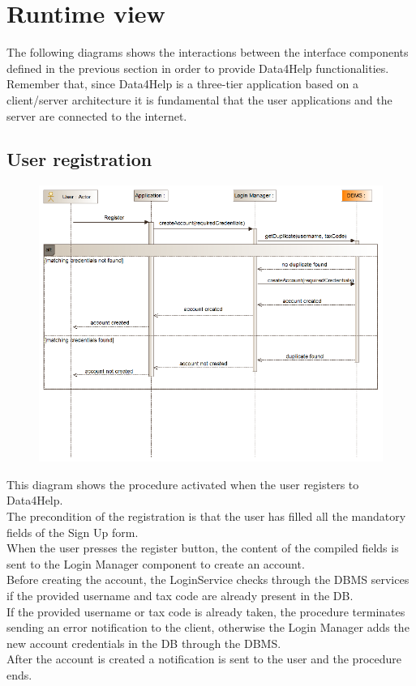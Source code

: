 \section{Runtime view}
The following diagrams shows the interactions between the interface components defined in the previous section in  order to provide Data4Help functionalities. Remember that, since Data4Help is a three-tier application based on a client/server architecture it is fundamental that the user applications and the server are connected to the internet.
\subsection{User registration}
\begin{figure}[H]
\centering
\includegraphics[width=\linewidth]{resources/uml/sequence/Registration.png}
\end{figure}
This diagram shows the procedure activated when the user registers to Data4Help.\\
The precondition of the registration is that the user has filled all the mandatory fields of the Sign Up form.\\
When the user presses the register button, the content of the compiled fields is sent to the Login Manager component to create an account.\\
Before creating the account, the LoginService checks through the DBMS services if the provided username and tax code are already present in the DB.\\
If the provided username or tax code is already taken, the procedure terminates sending an error notification to the client, otherwise the Login Manager adds the new account credentials in the DB through the DBMS.\\
After the account is created a notification is sent to the user and the procedure ends.


